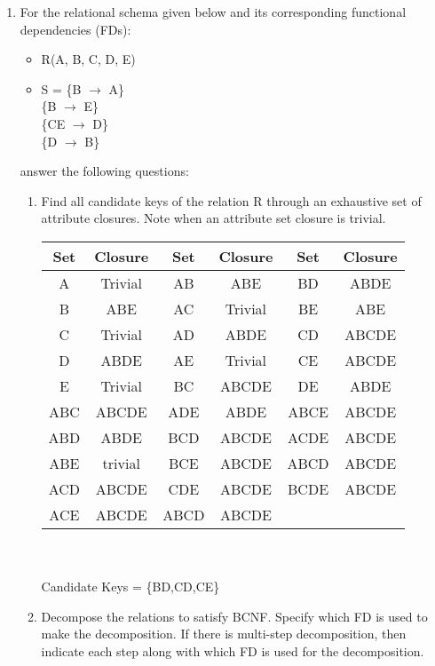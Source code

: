 \documentclass[12pt]{article}
\begin{document}
\begin{enumerate}
\item For the relational schema given below and its corresponding functional dependencies (FDs):
  \begin{itemize}
  \item R(A, B, C, D, E)
  \item S = \{B $\to$ A\} \\ 
          \hspace*{0.7cm} \{B $\to$ E\} \\ 
          \hspace*{0.7cm} \{CE $\to$ D\} \\ 
          \hspace*{0.7cm} \{D $\to$ B\}
  \end{itemize}
  answer the following questions:
  \begin{enumerate}
    \item Find all candidate keys of the relation R through an exhaustive set of attribute closures. Note when an attribute set closure is trivial. \\ 
    \begin{tabular}[t]{|c|c||c|c||c|c|}
      \hline
      \textbf{Set} & \textbf{Closure} & \textbf{Set} & \textbf{Closure} & \textbf{Set} & \textbf{Closure} \\
      \hline
      A & Trivial & AB & ABE & BD & ABDE \\
      \hline
      B & ABE & AC & Trivial & BE & ABE \\ 
      \hline
      C & Trivial & AD & ABDE & CD & ABCDE \\
      \hline
      D & ABDE & AE & Trivial & CE & ABCDE \\
      \hline
      E & Trivial & BC & ABCDE & DE & ABDE \\
      \hline
      \hline
      ABC & ABCDE & ADE & ABDE & ABCE & ABCDE \\
      \hline
      ABD & ABDE & BCD & ABCDE & ACDE & ABCDE \\
      \hline
      ABE & trivial & BCE & ABCDE & ABCD & ABCDE \\
      \hline
      ACD & ABCDE & CDE & ABCDE & BCDE & ABCDE\\
      \hline
      ACE & ABCDE & ABCD & ABCDE & & \\
      \hline
    \end{tabular}    
    \\ \\
    Candidate Keys = \{BD,CD,CE\}
  \item Decompose the relations to satisfy BCNF. Specify which FD is used to make the decomposition. If there is multi-step decomposition, then indicate each step along with which FD is used for the decomposition. \\ \\

\end{enumerate}
\end{enumerate}
\end{document}
